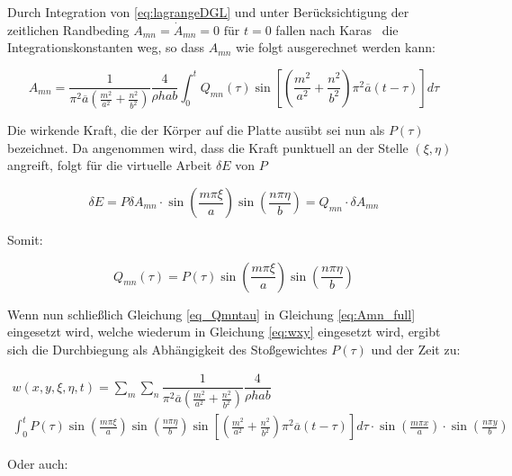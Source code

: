 Durch Integration von \ref{eq:lagrangeDGL} und unter Berücksichtigung der zeitlichen Randbeding $A_{mn} = \dot{A}_{mn} = 0 \text{ für } t = 0$ fallen nach Karas~\cite{Karas.1939} die Integrationskonstanten weg, so dass $A_{mn}$ wie folgt ausgerechnet werden kann:

\begin{equation}
A_{mn} = \dfrac{1}{\pi^2 \overline{a}  \left(\frac{m^2}{a^2} + \frac{n^2}{b^2} \right)} \dfrac{4}{\rho h a b} \int_0^t	Q_{mn}(\tau) \sin \left[ \left(\frac{m^2}{a^2} + \frac{n^2}{b^2} \right) \pi^2 \overline{a} (t-\tau)\right] d\tau
\label{eq:Amn_full}
\end{equation}


Die wirkende Kraft, die der Körper auf die Platte ausübt sei nun als $P(\tau)$ bezeichnet. 
Da angenommen wird, dass die Kraft punktuell an der Stelle $(\xi, \eta)$ angreift, folgt für die virtuelle Arbeit $\delta E$ von $P$

\begin{equation}
\delta E = P \delta A_{mn} \cdot \sin \left( \frac{m \pi \xi}{a} \right) \sin \left( \frac{n \pi \eta}{b} \right) = Q_{mn} \cdot \delta A_{mn}
\end{equation} 

Somit:

\begin{equation}
Q_{mn}(\tau) = P(\tau) \sin \left( \frac{m \pi \xi}{a} \right) \sin \left( \frac{n \pi \eta}{b} \right)
\label{eq_Qmntau}
\end{equation}



Wenn nun schließlich Gleichung \ref{eq_Qmntau} in Gleichung \ref{eq:Amn_full} eingesetzt wird, welche wiederum in Gleichung \ref{eq:wxy} eingesetzt wird, ergibt sich die Durchbiegung als Abhängigkeit des Stoßgewichtes $P(\tau)$ und der Zeit zu:

\begin{multline}
w(x,y,\xi, \eta, t) = \sum_m \sum_n 
\dfrac{1}{\pi^2 \overline{a}  \left(\frac{m^2}{a^2} + \frac{n^2}{b^2} \right)} \dfrac{4}{\rho h a b} \\ \int_0^t
 P(\tau) \sin \left( \frac{m \pi \xi}{a} \right) \sin \left( \frac{n \pi \eta}{b} \right)
\sin \left[ \left(\frac{m^2}{a^2} + \frac{n^2}{b^2} \right) \pi^2 \overline{a} (t-\tau)\right] d\tau
\cdot \sin\left(\frac{m \pi x}{a}\right) \cdot \sin\left(\frac{n \pi y}{b}\right)
\end{multline}

\newpage

Oder auch:

